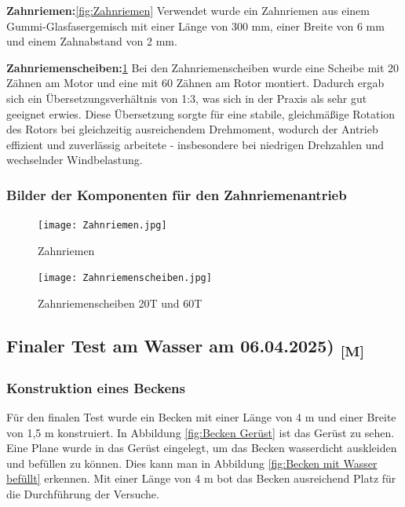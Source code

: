 \documentclass[a4paper,12pt]{article}
\begin{document}
\textbf{Zahnriemen:}\ref{fig:Zahnriemen}
Verwendet wurde ein Zahnriemen aus einem Gummi-Glasfasergemisch mit einer Länge von 300 mm, einer Breite von 6 mm und einem Zahnabstand von 2 mm.\cite{Riemen_für_Antrieb}\newline

\textbf{Zahnriemenscheiben:}\ref{fig:Zahnriemenscheiben}
Bei den Zahnriemenscheiben wurde eine Scheibe mit 20 Zähnen am Motor und eine mit 60 Zähnen am Rotor montiert. Dadurch ergab sich ein Übersetzungsverhältnis von 1:3, was sich in der Praxis als sehr gut geeignet erwies. Diese Übersetzung sorgte für eine stabile, gleichmäßige Rotation des Rotors bei gleichzeitig ausreichendem Drehmoment, wodurch der Antrieb effizient und zuverlässig arbeitete - insbesondere bei niedrigen Drehzahlen und wechselnder Windbelastung.\cite{Zahnriemenscheiben}

\subsubsection{Bilder der Komponenten für den Zahnriemenantrieb}

\begin{figure}[H]
    \centering
    \begin{minipage}[b]{0.45\linewidth}
        \centering
        \texttt{[image: Zahnriemen.jpg]}
        \caption{Zahnriemen\cite{Riemen_für_Antrieb}}
        \label{fig:Zahnriemen}
    \end{minipage}
    \hfill
    \begin{minipage}[b]{0.45\linewidth}
        \centering
        \texttt{[image: Zahnriemenscheiben.jpg]}
        \caption{Zahnriemenscheiben 20T und 60T\cite{Zahnriemenscheiben}}
        \label{fig:Zahnriemenscheiben}
    \end{minipage}
\end{figure}

\newpage

\subsection{\texorpdfstring{Finaler Test am Wasser am 06.04.2025) \textsubscript{[M]}}{Finaler Test am Wasser am 06.04.2025) [M]}}

\subsubsection{Konstruktion eines Beckens}

Für den finalen Test wurde ein Becken mit einer Länge von 4 m und einer Breite von 1,5 m konstruiert. In Abbildung \ref{fig:Becken Gerüst} ist das Gerüst zu sehen. Eine Plane wurde in das Gerüst eingelegt, um das Becken wasserdicht auskleiden und befüllen zu können. Dies kann man in Abbildung \ref{fig:Becken mit Wasser befüllt} erkennen. Mit einer Länge von 4 m bot das Becken ausreichend Platz für die Durchführung der Versuche.
\end{document}
